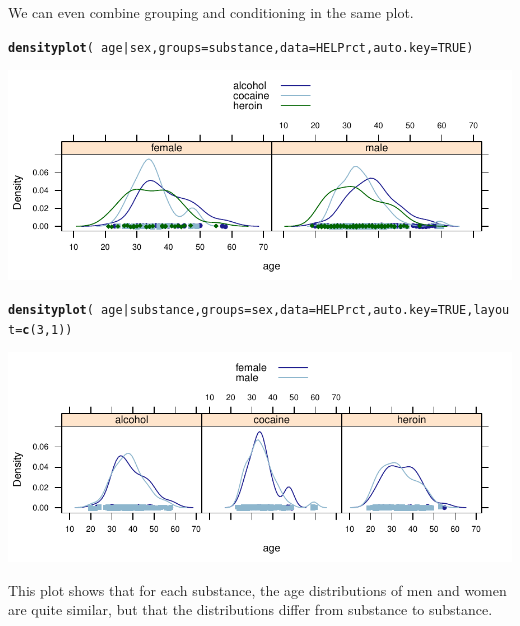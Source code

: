 \documentclass[twoside]{book}\usepackage[]{graphicx}\usepackage[]{xcolor}
\makeatletter
\def\maxwidth{ %
  \ifdim\Gin@nat@width>\linewidth
    \linewidth
  \else
    \Gin@nat@width
  \fi
}
\newcommand{\hlnum}[1]{\textcolor[rgb]{0.686,0.059,0.569}{#1}}%
\newcommand{\hlopt}[1]{\textcolor[rgb]{0,0,0}{#1}}%
\newcommand{\hlstd}[1]{\textcolor[rgb]{0.345,0.345,0.345}{#1}}%
\newcommand{\hlkwc}[1]{\textcolor[rgb]{0.333,0.667,0.333}{#1}}%
\newcommand{\hlkwd}[1]{\textcolor[rgb]{0.737,0.353,0.396}{\textbf{#1}}}%
\newenvironment{kframe}{%
 \def\at@end@of@kframe{}%
 \ifinner\ifhmode%
  \def\at@end@of@kframe{\end{minipage}}%
  \begin{minipage}{\columnwidth}%
 \fi\fi%
 \def\FrameCommand##1{\hskip\@totalleftmargin \hskip-\fboxsep
 \colorbox{shadecolor}{##1}\hskip-\fboxsep
     \hskip-\linewidth \hskip-\@totalleftmargin \hskip\columnwidth}%
 \MakeFramed {\advance\hsize-\width
   \@totalleftmargin\z@ \linewidth\hsize
   \@setminipage}}%
 {\par\unskip\endMakeFramed%
 \at@end@of@kframe}
\newenvironment{knitrout}{}{} %
\makeatother
\begin{document}
We can even combine grouping and conditioning in the same plot.
\begin{knitrout}
\color{fgcolor}\begin{kframe}
\begin{alltt}
\hlkwd{densityplot}\hlstd{(}\hlopt{~}\hlstd{age}\hlopt{|}\hlstd{sex,} \hlkwc{groups}\hlstd{=substance,} \hlkwc{data}\hlstd{=HELPrct,} \hlkwc{auto.key}\hlstd{=}\hlnum{TRUE}\hlstd{)}
\end{alltt}
\end{kframe}

{\centering \includegraphics[width=\maxwidth]{figures/fig-groups-conditions-1} 

}



\end{knitrout}
\begin{knitrout}
\color{fgcolor}\begin{kframe}
\begin{alltt}
\hlkwd{densityplot}\hlstd{(}\hlopt{~}\hlstd{age}\hlopt{|}\hlstd{substance,} \hlkwc{groups}\hlstd{=sex,} \hlkwc{data}\hlstd{=HELPrct,} \hlkwc{auto.key}\hlstd{=}\hlnum{TRUE}\hlstd{,} \hlkwc{layout}\hlstd{=}\hlkwd{c}\hlstd{(}\hlnum{3}\hlstd{,}\hlnum{1}\hlstd{))}
\end{alltt}
\end{kframe}

{\centering \includegraphics[width=\maxwidth]{figures/fig-groups-conditions2-1} 

}



\end{knitrout}
This plot shows that for each substance, the age distributions of men and 
women are quite similar, but that the distributions differ from 
substance to substance.
\end{document}
